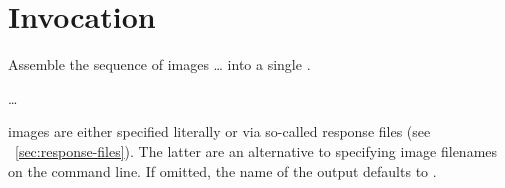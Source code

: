 

\chapter[Invocation]{\label{sec:invocation}%
  Invocation}


\noindent Assemble the sequence of images \dots{} into a single .

\smallskip

\code{\app}  
\dots

\smallskip

%
%
%
%
\noindent {} images are either specified literally or via so-called response files
(see \sectionName~\ref{sec:response-files}).  The latter are an alternative to specifying image
filenames on the command line.  If omitted, the name of the output  defaults to
.









